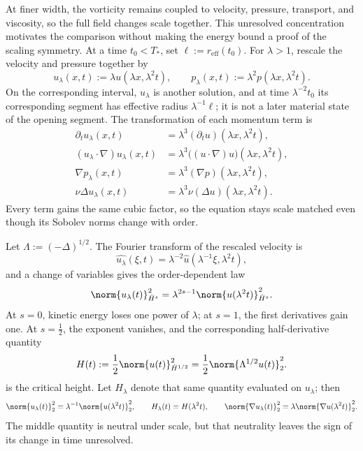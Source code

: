 
At finer width, the vorticity remains coupled to velocity, pressure, transport, and viscosity, so the full field changes scale together.
This unresolved concentration motivates the comparison without making the energy bound a proof of the scaling symmetry.
At a time \(t_0<T_*\), set \(\ell:=r_{\mathrm{eff}}(t_0)\).
For \(\lambda>1\), rescale the velocity and pressure together by
\[
  u_\lambda(x,t)
  :=
  \lambda u(\lambda x,\lambda^2t),
  \qquad
  p_\lambda(x,t)
  :=
  \lambda^2p(\lambda x,\lambda^2t).
\]
On the corresponding interval, \(u_\lambda\) is another \NavierStokes{} solution, and at time \(\lambda^{-2}t_0\) its corresponding segment has effective radius \(\lambda^{-1}\ell\); it is not a later material state of the opening segment.
The transformation of each momentum term is
\[
\begin{aligned}
  \partial_tu_\lambda(x,t)
  &=
  \lambda^3(\partial_tu)(\lambda x,\lambda^2t),
  \\
  (u_\lambda\cdot\nabla)u_\lambda(x,t)
  &=
  \lambda^3\bigl((u\cdot\nabla)u\bigr)(\lambda x,\lambda^2t),
  \\
  \nabla p_\lambda(x,t)
  &=
  \lambda^3(\nabla p)(\lambda x,\lambda^2t),
  \\
  \nu\Delta u_\lambda(x,t)
  &=
  \lambda^3\nu(\Delta u)(\lambda x,\lambda^2t).
\end{aligned}
\]
Every term gains the same cubic factor, so the equation stays scale matched even though its Sobolev norms change with order.


Let \(\Lambda:=(-\Delta)^{1/2}\).
The Fourier transform of the rescaled velocity is
\[
  \widehat{u_\lambda}(\xi,t)
  =
  \lambda^{-2}\widehat u(\lambda^{-1}\xi,\lambda^2t),
\]
and a change of variables gives the order-dependent law
\[
  \norm{u_\lambda(t)}_{\dot H^s}^2
  =
  \lambda^{2s-1}
  \norm{u(\lambda^2t)}_{\dot H^s}^2.
\]
At \(s=0\), kinetic energy loses one power of \(\lambda\); at \(s=1\), the first derivatives gain one.
At \(s=\tfrac12\), the exponent vanishes, and the corresponding half-derivative quantity
\[
  H(t)
  :=
  \frac12\norm{u(t)}_{\dot H^{1/2}}^2
  =
  \frac12\norm{\Lambda^{1/2}u(t)}_2^2.
\]
is the critical height.
Let \(H_\lambda\) denote that same quantity evaluated on \(u_\lambda\); then
\[
  \norm{u_\lambda(t)}_2^2
  =
  \lambda^{-1}\norm{u(\lambda^2t)}_2^2,
  \qquad
  H_\lambda(t)=H(\lambda^2t),
  \qquad
  \norm{\nabla u_\lambda(t)}_2^2
  =
  \lambda\norm{\nabla u(\lambda^2t)}_2^2.
\]
The middle quantity is neutral under scale, but that neutrality leaves the sign of its change in time unresolved.

